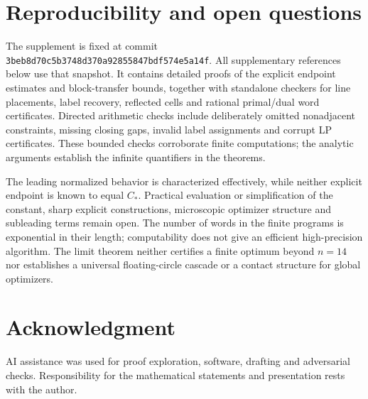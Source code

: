 \documentclass[11pt]{article}
\theoremstyle{definition}\newtheorem{definition}[theorem]{Definition}
\theoremstyle{remark}\newtheorem{remark}[theorem]{Remark}
\newcommand{\CC}{C_\ast}
\begin{document}
\section{Reproducibility and open questions}

The supplement \cite{supplement} is fixed at commit
\texttt{3beb8d70c5b3748d370a92855847bdf574e5a14f}.
All supplementary references below use that snapshot. It contains detailed
proofs of the explicit endpoint estimates and block-transfer bounds, together
with standalone checkers for line placements, label recovery, reflected
cells and rational primal/dual word certificates. Directed arithmetic checks
include deliberately omitted nonadjacent constraints, missing closing gaps,
invalid label assignments and corrupt LP certificates. These bounded checks
corroborate finite computations; the analytic arguments establish the infinite
quantifiers in the theorems.

The leading normalized behavior is characterized effectively, while neither
explicit endpoint is known to equal $\CC$. Practical evaluation or
simplification of the constant, sharp explicit constructions, microscopic
optimizer structure and subleading terms remain open. The number of words
in the finite programs is exponential in their length; computability does
not give an efficient high-precision algorithm. The limit theorem neither
certifies a finite optimum beyond $n=14$ nor establishes a universal
floating-circle cascade or a contact structure for global optimizers.

\section*{Acknowledgment}
AI assistance was used for proof exploration, software, drafting and
adversarial checks. Responsibility for the mathematical statements and
presentation rests with the author.
\end{document}
